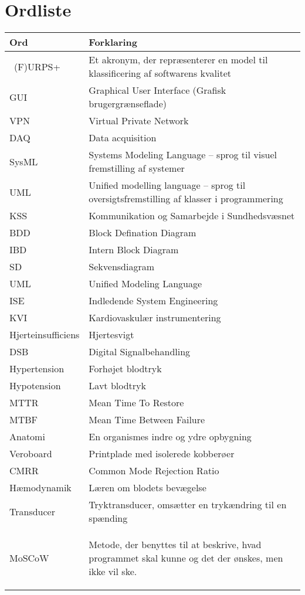 \chapter{Ordliste}

\begin{longtabu} to 
    Ord &    Forklaring\\
    \toprule\
(F)URPS+ 	&    Et akronym, der repræsenterer en model til klassificering af softwarens kvalitet \\
    GUI		&	Graphical User Interface (Grafisk brugergrænseflade)\\
    VPN		&	Virtual Private Network\\
    DAQ		&	Data acquisition \\
    SysML	&   Systems Modeling Language – sprog til visuel fremstilling af systemer \\
    UML		& Unified modelling language – sprog til oversigtsfremstilling af klasser i programmering \\
    KSS		&	Kommunikation og Samarbejde i Sundhedsvæsnet \\
    BDD 	&	Block Defination Diagram \\
	IBD		& 	Intern Block Diagram \\
	SD		& 	Sekvensdiagram \\
	UML		& 	Unified Modeling Language \\
	ISE 	&	Indledende System Engineering \\
	KVI		&	Kardiovaskulær instrumentering \\
	Hjerteinsufficiens &  Hjertesvigt \\
	DSB		&	Digital Signalbehandling \\
	Hypertension &  Forhøjet blodtryk \\
	Hypotension & Lavt blodtryk \\
	MTTR	&	Mean Time To Restore \\
	MTBF	&	Mean Time Between Failure \\
	Anatomi & 	En organismes indre og ydre opbygning \\
	Veroboard &	Printplade med isolerede kobberøer \\
	CMRR	&	Common Mode Rejection Ratio \\
	Hæmodynamik & Læren om blodets bevægelse\\
	Transducer & Tryktransducer, omsætter en trykændring til en spænding \\  
	MoSCoW		& Metode, der benyttes til at beskrive, hvad programmet skal kunne og det der ønskes, men ikke vil ske.
 
\label{forkort}
\end{longtabu}